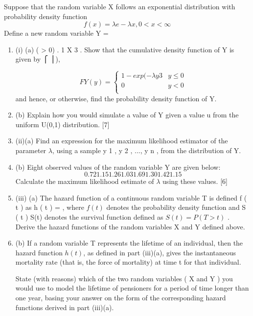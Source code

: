 \documentclass[a4paper,12pt]{article}
\begin{document}
Suppose that the random variable X follows an exponential distribution with
probability density function
\[f ( x ) = \lambda e −\lambda x , 0 < x < ∞\]
Define a new random variable Y =


\begin{enumerate}
\item (i)
(a)
( \lambda > 0) .
1
X 3 .
Show that the cumulative density function of Y is given by
⎧ ⎪),


\[ F Y ( y ) = \begin{cases}  1 − exp( −\lambda y 3  &  y \leq 0 \\
 0 & y < 0 \\
 \end{cases}
 \]
and hence, or otherwise, find the probability density function of Y.

\item (b) Explain how you would simulate a value of Y given a value u from the
uniform U(0,1) distribution.
[7]
\item (ii)(a) Find an expression for the maximum likelihood estimator of the
parameter $\lambda$, using a sample y 1 , y 2 , ..., y n , from the distribution of Y.
\item (b) Eight observed values of the random variable Y are given below:
\[0.72 1.15 1.26 1.03 1.69 1.30 1.42 1.15\]
Calculate the maximum likelihood estimate of $\lambda$ using these values. [6]
\item (iii)
(a)
The hazard function of a continuous random variable T is defined
f ( t )
as h ( t ) =
, where $f(t)$ denotes the probability density function and
S ( t )
S(t) denotes the survival function defined as $S ( t ) = P ( T > t )$ .
Derive the hazard functions of the random variables X and Y defined
above.
\item (b)
If a random variable T represents the lifetime of an individual, then the
hazard function $h ( t )$, as defined in part (iii)(a), gives the instantaneous
mortality rate (that is, the force of mortality) at time t for that
individual.

State (with reasons) which of the two random variables ( X and Y ) you
would use to model the lifetime of pensioners for a period of time
longer than one year, basing your answer on the form of the
corresponding hazard functions derived in part (iii)(a).
\end{enumerate}
\newpage
\end{document}
